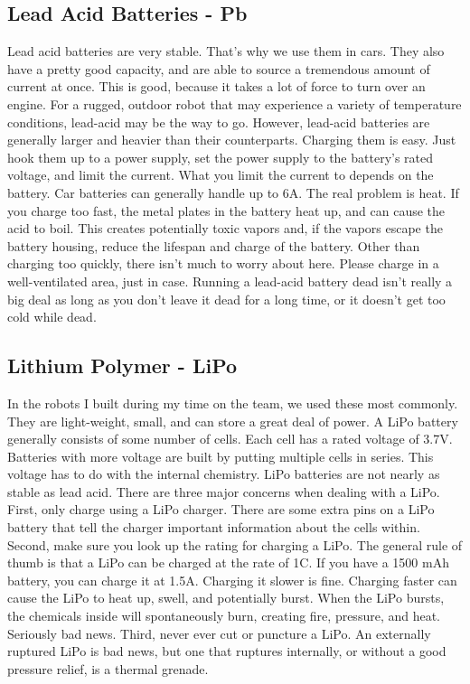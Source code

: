 \subsection{Lead Acid Batteries - Pb}

Lead acid batteries are very stable. That's why we use them in cars. They also have a pretty good capacity, and are able to source a tremendous amount of current at once. This is good, because it takes a lot of force to turn over an engine. For a rugged, outdoor robot that may experience a variety of temperature conditions, lead-acid may be the way to go. However, lead-acid batteries are generally larger and heavier than their counterparts. Charging them is easy. Just hook them up to a power supply, set the power supply to the battery's rated voltage, and limit the current. What you limit the current to depends on the battery. Car batteries can generally handle up to 6A. The real problem is heat. If you charge too fast, the metal plates in the battery heat up, and can cause the acid to boil. This creates potentially toxic vapors and, if the vapors escape the battery housing, reduce the lifespan and charge of the battery. Other than charging too quickly, there isn't much to worry about here. Please charge in a well-ventilated area, just in case. Running a lead-acid battery dead isn't really a big deal as long as you don't leave it dead for a long time, or it doesn't get too cold while dead.

\subsection{Lithium Polymer - LiPo}

In the robots I built during my time on the team, we used these most commonly. They are light-weight, small, and can store a great deal of power. A LiPo battery generally consists of some number of cells. Each cell has a rated voltage of 3.7V. Batteries with more voltage are built by putting multiple cells in series. This voltage has to do with the internal chemistry. LiPo batteries are not nearly as stable as lead acid. There are three major concerns when dealing with a LiPo. First, only charge using a LiPo charger. There are some extra pins on a LiPo battery that tell the charger important information about the cells within. Second, make sure you look up the rating for charging a LiPo. The general rule of thumb is that a LiPo can be charged at the rate of 1C. If you have a 1500 mAh battery, you can charge it at 1.5A. Charging it slower is fine. Charging faster can cause the LiPo to heat up, swell, and potentially burst. When the LiPo bursts, the chemicals inside will spontaneously burn, creating fire, pressure, and heat. Seriously bad news. Third, never ever cut or puncture a LiPo. An externally ruptured LiPo is bad news, but one that ruptures internally, or without a good pressure relief, is a thermal grenade.

